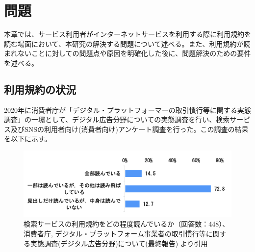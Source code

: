 \chapter{問題}
\label{issue}

本章では、サービス利用者がインターネットサービスを利用する際に利用規約を読む場面において、本研究の解決する問題について述べる。また、利用規約が読まれないことに対しての問題点や原因を明確化した後に、問題解決のための要件を述べる。

\section{利用規約の状況}
2020年に消費者庁が「デジタル・プラットフォーマーの取引慣行等に関する実態調査」の一環として、デジタル広告分野についての実態調査を行い、検索サービス及びSNSの利用者向け(消費者向け)アンケート調査を行った。この調査の結果を以下に示す。

\begin{figure}[h]
  \begin{center}
      \includegraphics[width=14cm]{img/searchtosyomu.png}
      \caption{検索サービスの利用規約をどの程度読んでいるか（回答数：448）、消費者庁, デジタル・プラットフォーム事業者の取引慣行等に関する実態調査(デジタル広告分野)について(最終報告)\cite{jftc2021} より引用}
      \label{img:searcjtosyomu}
  \end{center}
\end{figure}